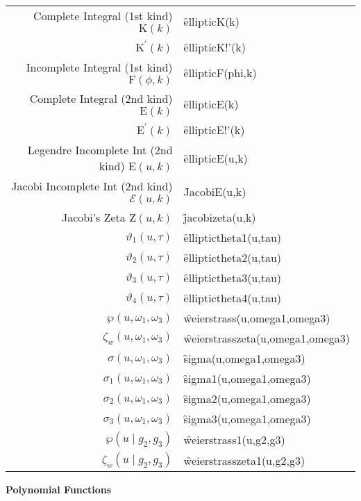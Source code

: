 {\begin{tabular}{r l}
Complete Integral (1st kind) $\mathrm{K}(k)$ & \f{ellipticK(k)}\\
$\mathrm{K}^\prime(k)$ & \f{ellipticK!'(k)}\\
Incomplete Integral (1st kind) $\mathrm{F}(\phi,k)$ & \f{ellipticF(phi,k)}\\
Complete Integral (2nd kind) $\mathrm{E}(k)$ & \f{ellipticE(k)}\\
$\mathrm{E}^\prime(k)$ & \f{ellipticE!'(k)}\\
Legendre Incomplete Int (2nd kind) $\mathrm{E}(u,k)$ & \f{ellipticE(u,k)}\\
Jacobi Incomplete Int (2nd kind) $\mathcal{E}(u,k)$ & \f{JacobiE(u,k)}\\
Jacobi's Zeta $\mathrm{Z}(u,k)$ & \f{jacobizeta(u,k)}\\
$\vartheta_1(u,\tau)$ & \f{elliptictheta1(u,tau)}\\
$\vartheta_2(u,\tau)$ & \f{elliptictheta2(u,tau)}\\
$\vartheta_3(u,\tau)$ & \f{elliptictheta3(u,tau)}\\
$\vartheta_4(u,\tau)$ & \f{elliptictheta4(u,tau)}\\
$\wp(u,\omega_1, \omega_3)$ & \f{weierstrass(u,omega1,omega3)}\\
$\zeta_w(u,\omega_1, \omega_3)$ & \f{weierstrasszeta(u,omega1,omega3)}\\
$\sigma(u,\omega_1, \omega_3)$ & \f{sigma(u,omega1,omega3)}\\
$\sigma_1(u,\omega_1, \omega_3)$ & \f{sigma1(u,omega1,omega3)}\\
$\sigma_2(u,\omega_1, \omega_3)$ & \f{sigma2(u,omega1,omega3)}\\
$\sigma_3(u,\omega_1, \omega_3)$ & \f{sigma3(u,omega1,omega3)}\\
$\wp(u \mid g_2, g_3)$ & \f{weierstrass1(u,g2,g3)}\\
$\zeta_w(u \mid g_2, g_3)$ & \f{weierstrasszeta1(u,g2,g3)}\\[5pt]
\end{tabular}}
\newpage

\textbf{Polynomial Functions}
\hypertarget{SPECFNTAB4}{}


